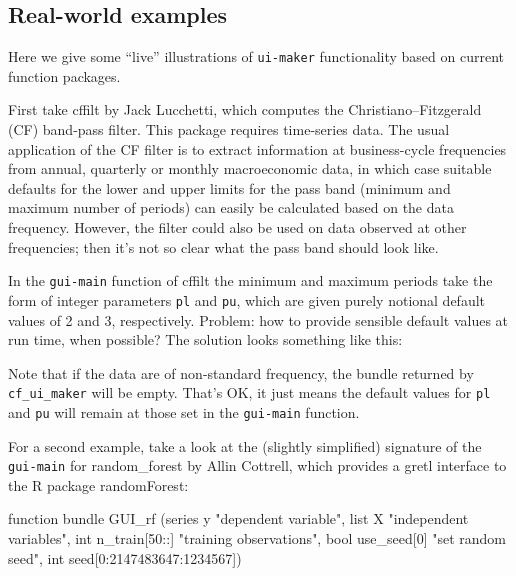 \documentclass[oneside]{book}
\begin{document}
\subsection{Real-world examples}

Here we give some ``live'' illustrations of \texttt{ui-maker}
functionality based on current function packages.

First take \textsf{cffilt} by Jack Lucchetti, which computes the
Christiano--Fitzgerald (CF) band-pass filter. This package requires
time-series data. The usual application of the CF filter is to extract
information at business-cycle frequencies from annual, quarterly or
monthly macroeconomic data, in which case suitable defaults for the
lower and upper limits for the pass band (minimum and maximum number
of periods) can easily be calculated based on the data
frequency. However, the filter could also be used on data observed at
other frequencies; then it's not so clear what the pass band should
look like.

In the \texttt{gui-main} function of \textsf{cffilt} the minimum and
maximum periods take the form of integer parameters \texttt{pl} and
\texttt{pu}, which are given purely notional default values of 2 and
3, respectively. Problem: how to provide sensible default values at
run time, when possible? The solution looks something like this:


Note that if the data are of non-standard frequency, the bundle
returned by \texttt{cf\_ui\_maker} will be empty. That's OK, it just
means the default values for \texttt{pl} and \texttt{pu} will remain
at those set in the \texttt{gui-main} function.

For a second example, take a look at the (slightly simplified)
signature of the \texttt{gui-main} for \textsf{random\_forest} by
Allin Cottrell, which provides a gretl interface to the \textsf{R}
package \textsf{randomForest}:
\begin{code}
function bundle GUI_rf (series y "dependent variable",
   list X "independent variables",
   int n_train[50::] "training observations",
   bool use_seed[0] "set random seed",
   int seed[0:2147483647:1234567])
\end{code}
\end{document}
